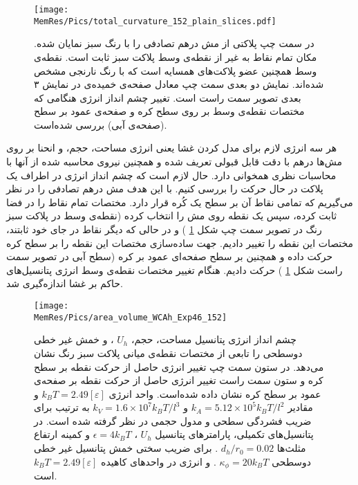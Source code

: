 \begin{figure}[htbp]
\begin{center}
\texttt{[image: \\MemRes/Pics/total\_curvature\_152\_plain\_slices.pdf]}
\caption{
در سمت چپ پلاکتی از مش درهم تصادفی را با رنگ سبز نمایان شده. مکان تمام نقاط به غیر از نقطه‌ی وسط پلاکت سبز ثابت است. نقطه‌ی وسط همچنین عضو پلاکت‌های همسایه‌ است که با رنگ نارنجی مشخص شده‌اند. نمایش دو بعدی سمت چپ معادل صفحه‌ی خمیده‌ی در نمایش ۳ بعدی تصویر سمت راست است. تغییر چشم انداز انرژی هنگامی که مختصات نقطه‌ی وسط بر روی سطح کره و صفحه‌ی عمود بر سطح (صفحه‌ی آبی) بررسی شده‌است.
}
\label{fig:PlacketRepresentaion}
\end{center}
\end{figure}

هر سه انرژی لازم برای مدل کردن غشا یعنی انرژی مساحت، حجم، و انحنا بر روی مش‌ها درهم با دقت قابل قبولی تعریف شده و همچنین نیروی محاسبه شده از آنها با محاسبات نظری همخوانی دارد. حال لازم است که چشم انداز انرژی در اطراف یک پلاکت در حال حرکت را بررسی کنیم. با این هدف مش درهم تصادفی را در نظر می‌گیریم که تمامی نقاط آن بر سطح یک کُره‌ قرار دارد. مختصات تمام نقاط را در فضا ثابت کرده، سپس یک نقطه روی مش را انتخاب کرده (نقطه‌ی وسط در پلاکت سبز رنگ در تصویر سمت چپ شکل
\ref{fig:PlacketRepresentaion}
) و در حالی که دیگر نقاط در جای خود ثابتند، مختصات این نقطه را تغییر دادیم. جهت ساده‌سازی مختصات این نقطه را  بر سطح کره‌ حرکت داده و همچنین بر سطح صفحه‌ای عمود بر کره (سطح آبی در تصویر سمت راست شکل
\ref{fig:PlacketRepresentaion}
) حرکت دادیم. هنگام تغییر مختصات نقطه‌ی وسط انرژی پتانسیل‌های حاکم بر غشا اندازه‌گیری شد. 




\begin{figure}[htbp]
\begin{center}
\texttt{[image: \\MemRes/Pics/area\_volume\_WCAh\_Exp46\_152]}
\caption{
چشم انداز انرژی پتانسیل مساحت، حجم،
$U_h$
، و خمش غیر خطی دوسطحی را تابعی از مختصات نقطه‌ی میانی پلاکت سبز رنگ نشان می‌دهد. در ستون سمت چپ تغییر انرژی حاصل از حرکت نقطه بر سطح کره و ستون سمت راست تغییر انرژی حاصل از حرکت نقطه بر صفحه‌ی عمود بر سطح کره  نشان داده شده‌است. واحد انرژی
$k_BT=2.49[\varepsilon]$
 و مقادیر 
 $k_A=5.12\times10^5k_BT/l^2$
 و
 $k_V=1.6\times10^7k_BT/l^3$
 به ترتیب برای ضریب فشردگی سطحی و مدول حجمی در نظر گرفته شده است. در پتانسیل‌های تکمیلی، پارامتر‌های پتانسیل 
 $U_h$
 ، 
$\epsilon=4k_BT$
 و کمینه ارتفاع مثلث‌ها 
 $d_h/r_0=0.02$ 
 . برای ضریب سختی خمش پتانسیل غیر خطی دوسطحی 
 $\kappa_{\phi}=20k_BT$
 . و انرژی در واحد‌های کاهیده
 $k_BT=2.49[\varepsilon]$
 است.
}
\label{fig:PlacketEnergyArea}
\end{center}
\end{figure}

